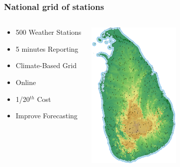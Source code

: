 \documentclass[serif,mathserif]{beamer}
\begin{document}
\begin{frame}
  \frametitle{National grid of stations}
\begin{columns}
\begin{center}
\begin{itemize}
 \item 500 Weather Stations
 \item 5 minutes Reporting
 \item Climate-Based Grid
 \item Online
 \item 1/20$^{th}$ Cost 
 \item Improve Forecasting
\end{itemize}
\end{center}

\begin{center}
 \includegraphics[width=4.5cm]{ws500.png}
\end{center}
\end{columns}
 \vspace{1mm}
\end{frame}

\end{document}
